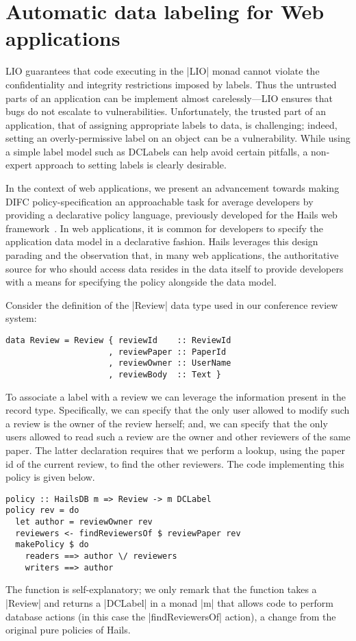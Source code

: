 \section{Automatic data labeling for Web applications}

LIO guarantees that code executing in the \hs|LIO| monad cannot
violate the confidentiality and integrity restrictions imposed by
labels.
%
Thus the untrusted parts of an application can be implement almost
carelessly---LIO ensures that bugs do not escalate to vulnerabilities.
%
Unfortunately, the trusted part of an application, that of assigning
appropriate labels to data, is challenging; indeed, setting an
overly-permissive label on an object can be a vulnerability.
%
While using a simple label model such as DCLabels can help avoid
certain pitfalls, a non-expert approach to setting labels is clearly
desirable.

In the context of web applications, we present an advancement towards
making DIFC policy-specification an approachable task for average
developers by providing a declarative policy language, previously
developed for the Hails web framework~\cite{hails}.
%
In web applications, it is common for developers to specify the
application data model in a declarative fashion.
%
Hails leverages this design parading and the observation that, in many
web applications, the authoritative source for who should access data
resides in the data itself to provide developers with a means for
specifying the policy alongside the data model.
%

Consider the definition of the \hs|Review| data type used in our
conference review system:
\begin{verbatim}
data Review = Review { reviewId    :: ReviewId
                     , reviewPaper :: PaperId
                     , reviewOwner :: UserName
                     , reviewBody  :: Text }
\end{verbatim}
To associate a label with a review we can leverage the 
information present in the record type.
%
Specifically, we can specify that the only user allowed to modify such
a review is the owner of the review herself; and, we can specify that
the only users allowed to read such a review are the owner and other
reviewers of the same paper.
%
The latter declaration requires that we perform a lookup, using the
paper id of the current review, to find the other reviewers.
%
The code implementing this policy is given below.
%
\begin{verbatim}
policy :: HailsDB m => Review -> m DCLabel
policy rev = do
  let author = reviewOwner rev
  reviewers <- findReviewersOf $ reviewPaper rev
  makePolicy $ do
    readers ==> author \/ reviewers
    writers ==> author
\end{verbatim}
%
The function is self-explanatory; we only remark that the function
takes a \hs|Review| and returns a \hs|DCLabel| in a monad \hs|m| that
allows code to perform database actions (in this case the
\hs|findReviewersOf| action), a change from the original pure policies
of Hails.
%


